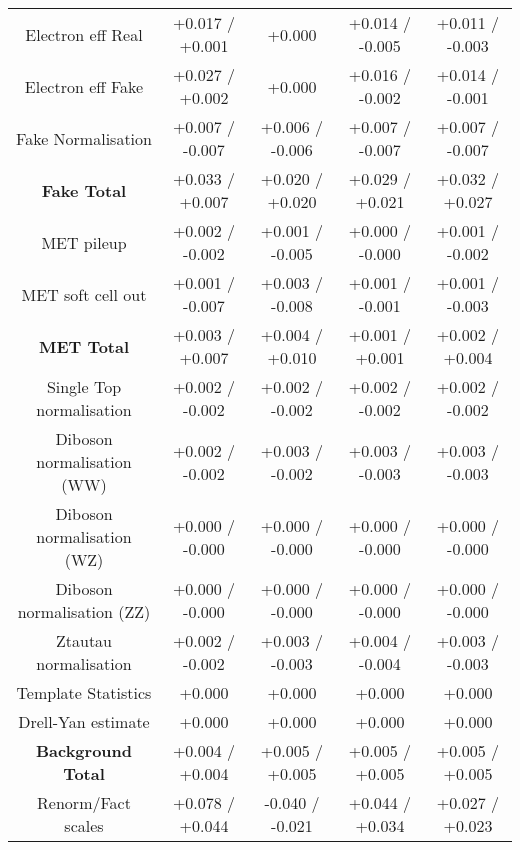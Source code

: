 \begin{table}[htbp]
\begin{center}
\begin{tabular}{|c|c|c|c|c|}
Electron eff Real                     &+0.017   / +0.001   & +0.000              & +0.014   / -0.005   & +0.011   / -0.003  \\
Electron eff Fake                     &+0.027   / +0.002   & +0.000              & +0.016   / -0.002   & +0.014   / -0.001  \\
Fake Normalisation                    &+0.007   / -0.007   & +0.006   / -0.006   & +0.007   / -0.007   & +0.007   / -0.007  \\
\hline
\textbf{Fake Total}                   &+0.033   / +0.007   & +0.020   / +0.020   & +0.029   / +0.021   & +0.032   / +0.027  \\
\hline
MET pileup                            &+0.002   / -0.002   & +0.001   / -0.005   & +0.000   / -0.000   & +0.001   / -0.002  \\
MET soft cell out                     &+0.001   / -0.007   & +0.003   / -0.008   & +0.001   / -0.001   & +0.001   / -0.003  \\
\hline
\textbf{MET Total}                    &+0.003   / +0.007   & +0.004   / +0.010   & +0.001   / +0.001   & +0.002   / +0.004  \\
\hline
Single Top normalisation              &+0.002   / -0.002   & +0.002   / -0.002   & +0.002   / -0.002   & +0.002   / -0.002  \\
Diboson normalisation (WW)            &+0.002   / -0.002   & +0.003   / -0.002   & +0.003   / -0.003   & +0.003   / -0.003  \\
Diboson normalisation (WZ)            &+0.000   / -0.000   & +0.000   / -0.000   & +0.000   / -0.000   & +0.000   / -0.000  \\
Diboson normalisation (ZZ)            &+0.000   / -0.000   & +0.000   / -0.000   & +0.000   / -0.000   & +0.000   / -0.000  \\
Ztautau normalisation                 &+0.002   / -0.002   & +0.003   / -0.003   & +0.004   / -0.004   & +0.003   / -0.003  \\
Template Statistics                   &+0.000              & +0.000              & +0.000              & +0.000             \\
Drell-Yan estimate                    &+0.000              & +0.000              & +0.000              & +0.000             \\
\hline
\textbf{Background Total}             &+0.004   / +0.004   & +0.005   / +0.005   & +0.005   / +0.005   & +0.005   / +0.005  \\
\hline
Renorm/Fact scales                    &+0.078   / +0.044   & -0.040   / -0.021   & +0.044   / +0.034   & +0.027   / +0.023  \\

\end{tabular}
\end{center}
\end{table}
